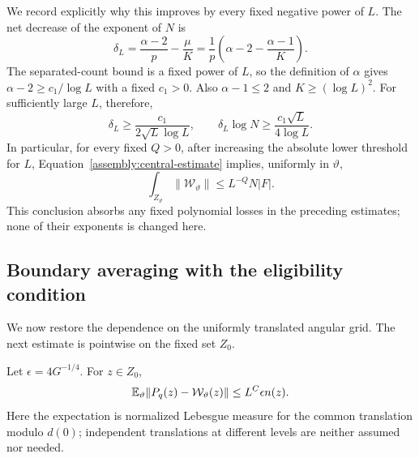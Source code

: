 We record explicitly why this improves by every fixed negative power
of \(L\).  The net decrease of the exponent of \(N\) is
\[
 \delta_L
   =\frac{\alpha-2}{p}-\frac\mu K
   =\frac1p\left(\alpha-2-\frac{\alpha-1}{K}\right).
\]
The separated-count bound is a fixed power of \(L\), so the
definition of \(\alpha\) gives \(\alpha-2\ge c_1/\log L\) with a
fixed \(c_1>0\).  Also \(\alpha-1\le2\) and
\(K\ge(\log L)^2\).  For sufficiently large \(L\), therefore,
\[
 \delta_L\ge\frac{c_1}{2\sqrt L\log L},
 \qquad
 \delta_L\log N\ge\frac{c_1\sqrt L}{4\log L}.
\]
In particular, for every fixed \(Q>0\), after increasing the absolute
lower threshold for \(L\), Equation~\eqref{assembly:central-estimate}
implies, uniformly in \(\vartheta\),
\begin{equation}\label{assembly:central-power-gain}
 \int_{Z_\vartheta}\|\mathcal W_\vartheta\|
           \le L^{-Q}N|F|.
\end{equation}
This conclusion absorbs any fixed polynomial losses in the preceding
estimates; none of their exponents is changed here.

\subsection{Boundary averaging with the eligibility condition}

We now restore the dependence on the uniformly translated angular
grid.  The next estimate is pointwise on the fixed set \(Z_0\).

\begin{lemma}\label{assembly:boundary-loss}
Let \(\epsilon=4G^{-1/4}\).  For \(z\in Z_0\),
\begin{equation}\label{assembly:expected-error}
 \mathbb E_\vartheta\|P_q(z)-\mathcal W_\vartheta(z)\|
                    \le L^C\epsilon n(z).
\end{equation}
Here the expectation is normalized Lebesgue measure for the common
translation modulo \(d(0)\); independent translations at different
levels are neither assumed nor needed.
\end{lemma}

